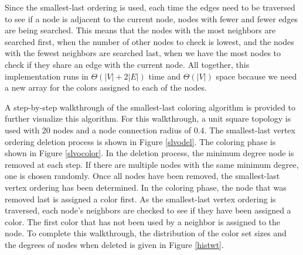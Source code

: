 \documentclass{article}
\begin{document}
        \par
        Since the smallest-last ordering is used, each time the edges need to be traversed to see if a node is adjacent to the current node, nodes with fewer and fewer edges are being searched. This means that the nodes with the most neighbors are searched first, when the number of other nodes to check is lowest, and the nodes with the fewest neighbors are searched last, when we have the most nodes to check if they share an edge with the current node. All together, this implementation runs in $\Theta(|V| + 2|E|)$ time and $\Theta(|V|)$ space because we need a new array for the colors assigned to each of the nodes.
        \par
        A step-by-step walkthrough of the smallest-last coloring algorithm is provided to further visualize this algorithm. For this walkthrough, a unit square topology is used with 20 nodes and a node connection radius of 0.4. The smallest-last vertex ordering deletion process is shown in Figure \ref{slvodel}. The coloring phase is shown in Figure \ref{slvocolor}. In the deletion process, the minimum degree node is removed at each step. If there are multiple nodes with the same minimum degree, one is chosen randomly. Once all nodes have been removed, the smallest-last vertex ordering has been determined. In the coloring phase, the node that was removed last is assigned a color first. As the smallest-last vertex ordering is traversed, each node's neighbors are checked to see if they have been assigned a color. The first color that has not been used by a neighbor is assigned to the node. To complete this walkthrough, the distribution of the color set sizes and the degrees of nodes when deleted is given in Figure \ref{histwt}.
\end{document}
